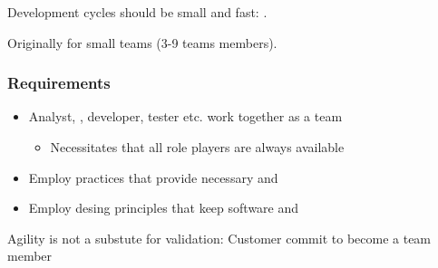 \documentclass[
    ../../Software_Engineering_Summary.tex,
]
{subfiles}
\begin{document}
Development cycles should be small and fast: .

Originally for small teams (3-9 teams members).

\subsubsection{Requirements}
\begin{itemize}
    \item Analyst, , developer, tester etc. work together as a team
    \begin{itemize}
        \item Necessitates that all role players are always available
    \end{itemize}
    \item Employ practices that provide necessary  and 
    \item Employ desing principles that keep software  and 
\end{itemize}

Agility is not a substute for validation: Customer  commit to become a team member
\end{document}
